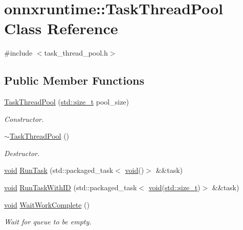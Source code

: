\hypertarget{classonnxruntime_1_1TaskThreadPool}{}\section{onnxruntime\+:\+:Task\+Thread\+Pool Class Reference}
\label{classonnxruntime_1_1TaskThreadPool}


{\ttfamily \#include $<$task\+\_\+thread\+\_\+pool.\+h$>$}

\subsection*{Public Member Functions}
\begin{DoxyCompactItemize}
\item 
\mbox{\hyperlink{classonnxruntime_1_1TaskThreadPool_a38ddfb570dc9c8aced5a710b762bcffd}{Task\+Thread\+Pool}} (\mbox{\hyperlink{mlasi_8h_a503efbc1c6e50825320ad909366b78ab}{std\+::size\+\_\+t}} pool\+\_\+size)
\begin{DoxyCompactList}\small\item\em Constructor. \end{DoxyCompactList}\item 
\mbox{\hyperlink{classonnxruntime_1_1TaskThreadPool_a8215519b62bff207184453687ebf5fd8}{$\sim$\+Task\+Thread\+Pool}} ()
\begin{DoxyCompactList}\small\item\em Destructor. \end{DoxyCompactList}\item 
\mbox{\hyperlink{mlasi_8h_a88f941d423cb2a819b70a1358982b1a6}{void}} \mbox{\hyperlink{classonnxruntime_1_1TaskThreadPool_adef074fd30b2be99af2f75392ad241ee}{Run\+Task}} (std\+::packaged\+\_\+task$<$ \mbox{\hyperlink{mlasi_8h_a88f941d423cb2a819b70a1358982b1a6}{void}}()$>$ \&\&task)
\item 
\mbox{\hyperlink{mlasi_8h_a88f941d423cb2a819b70a1358982b1a6}{void}} \mbox{\hyperlink{classonnxruntime_1_1TaskThreadPool_a3a4ac001b97cc07fe7e1ba589c631021}{Run\+Task\+With\+ID}} (std\+::packaged\+\_\+task$<$ \mbox{\hyperlink{mlasi_8h_a88f941d423cb2a819b70a1358982b1a6}{void}}(\mbox{\hyperlink{mlasi_8h_a503efbc1c6e50825320ad909366b78ab}{std\+::size\+\_\+t}})$>$ \&\&task)
\item 
\mbox{\hyperlink{mlasi_8h_a88f941d423cb2a819b70a1358982b1a6}{void}} \mbox{\hyperlink{classonnxruntime_1_1TaskThreadPool_a0628841b67f641cb9cdab712ff50b1d1}{Wait\+Work\+Complete}} ()
\begin{DoxyCompactList}\small\item\em Wait for queue to be empty. \end{DoxyCompactList}\end{DoxyCompactItemize}


